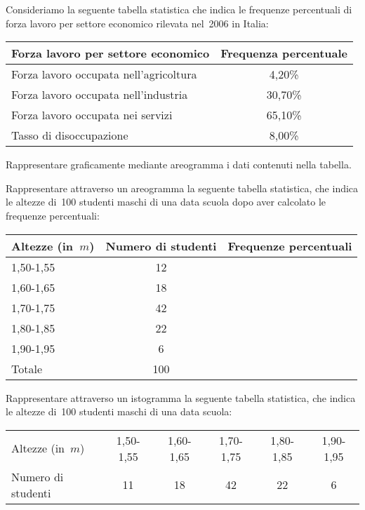\begin{esercizio}
\label{ese:A.17}
Consideriamo la seguente tabella statistica che indica le frequenze 
percentuali di forza lavoro per settore economico rilevata nel~2006 in 
Italia:
\begin{center}
\begin{tabular}{lc}
\toprule
Forza lavoro per settore economico & Frequenza percentuale\\
\midrule
Forza lavoro occupata nell'agricoltura & 4,20\%\\
Forza lavoro occupata nell'industria & 30,70\%\\
Forza lavoro occupata nei servizi & 65,10\%\\
Tasso di disoccupazione & 8,00\%\\
\bottomrule
\end{tabular}
\end{center}
Rappresentare graficamente mediante areogramma i dati contenuti nella 
tabella.
\end{esercizio}

\begin{esercizio}
\label{ese:A.18}
Rappresentare attraverso un areogramma la seguente tabella statistica, che 
indica le altezze di~100 studenti maschi
di una data scuola dopo aver calcolato le frequenze percentuali:
\begin{center}
\begin{tabular}{l*{2}{c}}
\toprule
Altezze (in~\(\unit{m}\)) & Numero di studenti & Frequenze percentuali\\
\midrule
1,50-1,55 & 12 & \\
1,60-1,65 & 18 & \\
1,70-1,75 & 42 & \\
1,80-1,85 & 22 & \\
1,90-1,95 & 6 & \\
\midrule
Totale & 100 & \\
\bottomrule
\end{tabular}
\end{center}

\end{esercizio}

\begin{esercizio}
\label{ese:A.19}
Rappresentare attraverso un istogramma la seguente tabella statistica, che 
indica le altezze di~100 studenti maschi di una data scuola:
\begin{center}
\begin{tabular}{l*{5}{c}}
\toprule
Altezze (in~\(\unit{m}\)) & 1,50-1,55 & 1,60-1,65 & 1,70-1,75 & 1,80-1,85 & 
1,90-1,95\\
Numero di studenti & 11 & 18 & 42 & 22 & 6 \\
\bottomrule
\end{tabular}
\end{center}
\end{esercizio}


